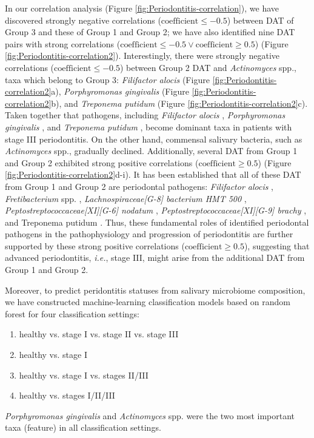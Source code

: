 \documentclass[11pt, a4paper, onecolumn, oneside]{report}
\begin{document}
            In our correlation analysis (Figure \ref{fig:Periodontitis-correlation}), we have discovered strongly negative correlations ($\textrm{coefficient} \le -0.5$) between DAT of Group 3 and these of Group 1 and Group 2; we have also identified nine DAT pairs with strong correlations ($\textrm{coefficient} \le -0.5 \vee \textrm{coefficient} \ge 0.5$) (Figure \ref{fig:Periodontitis-correlation2}). Interestingly, there were strongly negative correlations ($\textrm{coefficient} \le -0.5$) between Group 2 DAT and \textit{Actinomyces} spp., taxa which belong to Group 3: \textit{Filifactor alocis} (Figure \ref{fig:Periodontitis-correlation2}a), \textit{Porphyromonas gingivalis} (Figure \ref{fig:Periodontitis-correlation2}b), and \textit{Treponema putidum} (Figure \ref{fig:Periodontitis-correlation2}c). Taken together that pathogens, including \textit{Filifactor alocis} \cite{Periodontitis-31, Periodontitis-32}, \textit{Porphyromonas gingivalis} \cite{Periodontitis-22}, and \textit{Treponema putidum} \cite{Periodontitis-25}, become dominant taxa in patients with stage III periodontitis. On the other hand, commensal salivary bacteria, such as \textit{Actinomyces} spp., gradually declined. Additionally, several DAT from Group 1 and Group 2 exhibited strong positive correlations ($\textrm{coefficient} \ge 0.5$) (Figure \ref{fig:Periodontitis-correlation2}d-i). It has been established that all of these DAT from Group 1 and Group 2 are periodontal pathogens: \textit{Filifactor alocis} \cite{Periodontitis-31, Periodontitis-32}, \textit{Fretibacterium} spp. \cite{Periodontitis-33}, \textit{Lachnospiraceae[G-8] bacterium HMT 500} \cite{Periodontitis-8}, \textit{Peptostreptococcaceae[XI][G-6] nodatum} \cite{Periodontitis-8, Periodontitis-34}, \textit{Peptostreptococcaceae[XI][G-9] brachy} \cite{Periodontitis-8}, and Treponema putidum \cite{Periodontitis-25}. Thus, these fundamental roles of identified periodontal pathogens in the pathophysiology and progression of periodontitis are further supported by these strong positive correlations ($\textrm{coefficient} \ge 0.5$), suggesting that advanced periodontitis, \textit{i.e.}, stage III, might arise from the additional DAT from Group 1 and Group 2.

            Moreover, to predict peridontitis statuses from salivary microbiome composition, we have constructed machine-learning classification models based on random forest for four classification settings:
            \begin{enumerate}
                \item healthy vs. stage I vs. stage II vs. stage III
                \item healthy vs. stage I
                \item healthy vs. stage I vs. stages II/III
                \item healthy vs. stages I/II/III
            \end{enumerate}
            \textit{Porphyromonas gingivalis} and \textit{Actinomyces} spp. were the two most important taxa (feature) in all classification settings.
        \newpage
\end{document}
